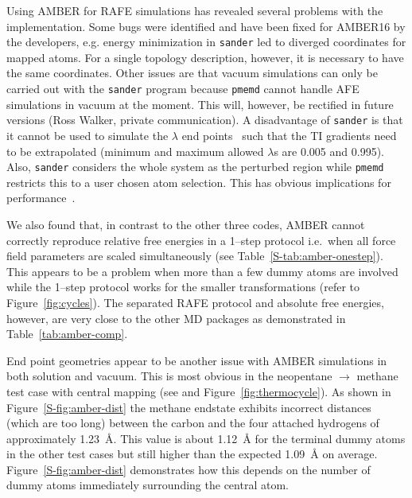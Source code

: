 \documentclass[journal=jctcce,manuscript=article]{achemso}
\newcommand{\progname}[1]{\texttt{#1}}
\begin{document}
Using AMBER for RAFE simulations has revealed several problems with
the implementation.  Some bugs were identified and have been fixed for AMBER16
by the developers, e.g. energy minimization in \progname{sander} led to diverged
coordinates for mapped atoms.  For a single topology description, however, it 
is necessary to have the same coordinates.  Other issues are that vacuum
simulations can only be carried out with the \progname{sander} program 
because \progname{pmemd} cannot handle AFE simulations in vacuum at the moment.  This will, however, be rectified in future versions (Ross Walker, private communication).  A disadvantage of \progname{sander} is that it cannot be used to simulate the $\lambda$ end points~\cite{doi:10.1021/ct400340s} such that the TI gradients need to be extrapolated (minimum and maximum allowed $\lambda$s are 0.005 and 0.995). 
 Also, \progname{sander} considers the whole system as the perturbed
region while \progname{pmemd} restricts this to a user chosen atom selection.  This
has obvious implications for performance~\cite{doi:10.1021/ct400340s}.

We also found that, in contrast to the other three codes, AMBER cannot
correctly reproduce relative free energies in a 1--step protocol i.e.\
when all force field parameters are scaled simultaneously (see Table~\ref{S-tab:amber-onestep}).  This appears to be a problem when more than a few dummy atoms are involved while the 1--step protocol works for the smaller transformations (refer to Figure~\ref{fig:cycles}).  The separated RAFE protocol and absolute free energies, however, are very close to the other MD packages as demonstrated in Table~\ref{tab:amber-comp}.

End point geometries appear to be another issue with AMBER simulations
in both solution and vacuum.  This is most obvious in the neopentane 
$\rightarrow$ methane test case with central mapping (see 
 and Figure~\ref{fig:thermocycle}).
As shown in Figure~\ref{S-fig:amber-dist} the methane endstate exhibits 
incorrect distances (which are too long) between the carbon and the four 
attached hydrogens of approximately \SI{1.23}{\angstrom}.  This value is about 
\SI{1.12}{\angstrom} for the terminal dummy atoms in the other test cases but 
still higher than the expected \SI{1.09}{\angstrom} on average.  
Figure~\ref{S-fig:amber-dist} demonstrates how this depends on the number of 
dummy atoms immediately surrounding the central atom.
\end{document}
